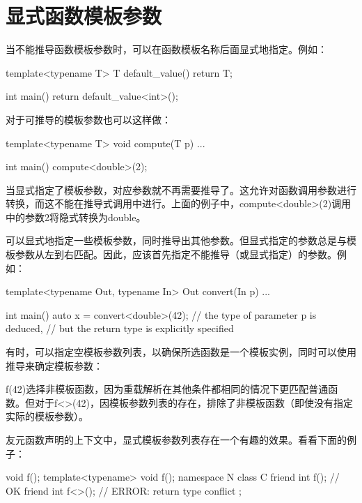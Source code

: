 \section{显式函数模板参数}
当不能推导函数模板参数时，可以在函数模板名称后面显式地指定。例如：

\begin{cpp}
template<typename T> T default_value()
{
	return T{};
}

int main()
{
	return default_value<int>();
}
\end{cpp}

对于可推导的模板参数也可以这样做：

\begin{cpp}
template<typename T> void compute(T p)
{
	...
}

int main()
{
	compute<double>(2);
}
\end{cpp}

当显式指定了模板参数，对应参数就不再需要推导了。这允许对函数调用参数进行转换，而这不能在推导式调用中进行。上面的例子中，compute<double>(2)调用中的参数2将隐式转换为double。

可以显式地指定一些模板参数，同时推导出其他参数。但显式指定的参数总是与模板参数从左到右匹配。因此，应该首先指定不能推导（或显式指定）的参数。例如：

\begin{cpp}
template<typename Out, typename In>
Out convert(In p)
{
	...
}

int main() {
	auto x = convert<double>(42); // the type of parameter p is deduced,
	// but the return type is explicitly specified
}
\end{cpp}

有时，可以指定空模板参数列表，以确保所选函数是一个模板实例，同时可以使用推导来确定模板参数：


f(42)选择非模板函数，因为重载解析在其他条件都相同的情况下更匹配普通函数。但对于f<>(42)，因模板参数列表的存在，排除了非模板函数（即使没有指定实际的模板参数）。

友元函数声明的上下文中，显式模板参数列表存在一个有趣的效果。看看下面的例子：

\begin{cpp}
void f();
template<typename> void f();
namespace N {
	class C {
		friend int f(); // OK
		friend int f<>(); // ERROR: return type conflict
	};
}
\end{cpp}

